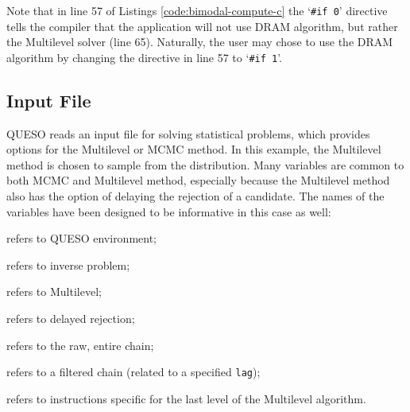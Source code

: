 



Note that in line 57 of Listings \ref{code:bimodal-compute-c} the `\verb+#if 0+' directive tells the compiler that the application will not use DRAM algorithm, but rather the Multilevel solver (line 65). Naturally, the user may chose to use the DRAM algorithm by changing the directive in line 57 to `\verb+#if 1+'.


 
  


\subsection{Input File}\label{sec:bimodal-input-file}


QUESO reads an input file for solving statistical problems, which provides options for the Multilevel or MCMC method. In this example, the Multilevel method is chosen to sample from the distribution. Many variables are common to both MCMC and Multilevel method, especially because the Multilevel method also has the option of delaying the rejection of a candidate. The names of the variables have been designed to be informative in this case as well:
\begin{description}\vspace{-8pt}
\item[ \texttt{env}:] refers to QUESO environment; \vspace{-8pt}
\item[ \texttt{ip}:] refers to inverse problem;\vspace{-8pt}
\item[ \texttt{ml}:] refers to Multilevel;\vspace{-8pt}
\item[ \texttt{dr}:] refers to delayed rejection;\vspace{-8pt}
\item[ \texttt{rawChain}:] refers to the raw, entire chain; \vspace{-8pt}
\item[ \texttt{filteredChain}:] refers to a filtered chain (related to a specified \texttt{lag});\vspace{-8pt}
\item[ \texttt{last}:] refers to instructions specific for the last level of the Multilevel algorithm.
\end{description}

